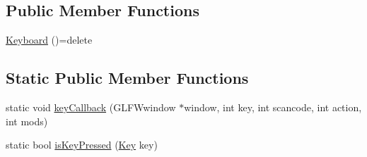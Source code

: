 \subsection*{Public Member Functions}
\begin{DoxyCompactItemize}
\item 
\hyperlink{classburn_1_1_keyboard_a19a1503e21e9177f471382297b35ed7c}{Keyboard} ()=delete
\end{DoxyCompactItemize}
\subsection*{Static Public Member Functions}
\begin{DoxyCompactItemize}
\item 
static void \hyperlink{classburn_1_1_keyboard_ab1be9327ff6ead986cbdbb1890e9a6d7}{key\-Callback} (G\-L\-F\-Wwindow $\ast$window, int key, int scancode, int action, int mods)
\item 
static bool \hyperlink{classburn_1_1_keyboard_ab68aa5aeaf306cadfb34995b53470bf2}{is\-Key\-Pressed} (\hyperlink{classburn_1_1_keyboard_a2aabfebd78080f013e704415293a4533}{Key} key)
\end{DoxyCompactItemize}


